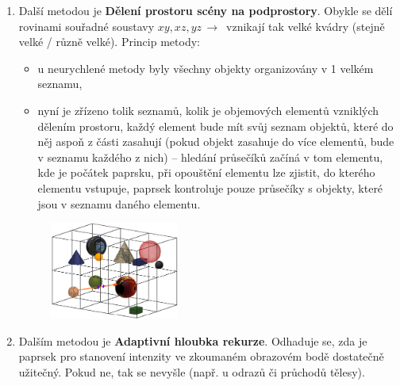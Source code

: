 \begin{enumerate}
\begin{figure}[H]
\end{figure}
\item Další metodou je \textbf{Dělení prostoru scény na podprostory}. Obykle se dělí rovinami souřadné soustavy $xy, xz, yz \,\to\,$ vznikají tak velké kvádry (stejně velké / různě velké). Princip metody:
\begin{itemize}
	\item u neurychlené metody byly všechny objekty organizovány v 1 velkém seznamu,
	\item nyní je zřízeno tolik seznamů, kolik je objemových elementů vzniklých dělením prostoru, každý element bude mít svůj seznam objektů, které do něj aspoň z části zasahují (pokud objekt zasahuje do více elementů, bude v seznamu každého z nich) -- hledání průsečíků začíná v tom elementu, kde je počátek paprsku, při opouštění elementu lze zjistit, do kterého elementu vstupuje, paprsek kontroluje pouze průsečíky s objekty, které jsou v seznamu daného elementu.
\end{itemize}
\begin{figure}[H]
\centering
\includegraphics[width=0.4\textwidth]{assets/6_deleni_podprostor}
\end{figure}
\item Dalším metodou je \textbf{Adaptivní hloubka rekurze}. Odhaduje se, zda je paprsek pro stanovení intenzity ve zkoumaném obrazovém bodě dostatečně užitečný. Pokud ne, tak se nevyšle (např. u odrazů či průchodů tělesy).
\end{enumerate}
